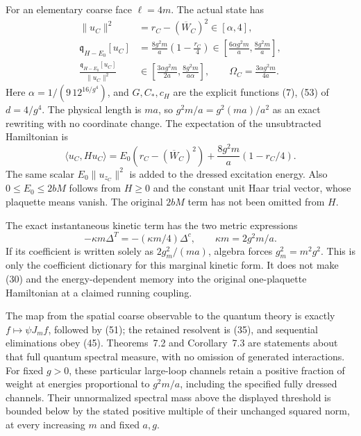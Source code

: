 \documentclass[11pt]{article}
\begin{document}
For an elementary coarse face $\ell=4m$. The actual state has
\begin{align}
 \|u_C\|^2&=r_C-(\overline W_C)^2\in[\alpha,4],\label{eq:physicalnorm}\\
 \mathfrak q_{H-E_0}[u_C]
 &=\frac{8g^2m}{a}\left(1-\frac{r_C}{4}\right)
       \in\left[\frac{6\alpha g^2m}{a},\frac{8g^2m}{a}\right],\label{eq:physicalenergy}\\
 \frac{\mathfrak q_{H-E_0}[u_C]}{\|u_C\|^2}
 &\in\left[\frac{3\alpha g^2m}{2a},\frac{8g^2m}{a\alpha}\right],
 \qquad \Omega_C=\frac{3\alpha g^2m}{4a}.\label{eq:physicalquotient}
\end{align}
Here
$\alpha=1/(9\,12^{16/g^4})$, and $G,C_*,c_H$ are the explicit functions
(7), (53) of $d=4/g^4$.
The physical length is $ma$, so $g^2m/a=g^2(ma)/a^2$ as an exact
rewriting with no coordinate change. The expectation of the unsubtracted
Hamiltonian is
\[
 \langle u_C,Hu_C\rangle
 =E_0(r_C-(\overline W_C)^2)
       +\frac{8g^2m}{a}(1-r_C/4).
\]
The same scalar $E_0\|u_{z_C}\|^2$ is added to the dressed excitation
energy. Also $0\leq E_0\leq2bM$ follows from $H\geq0$ and the constant
unit Haar trial vector, whose plaquette means vanish. The original
$2bM$ term has not been omitted from $H$.

The exact instantaneous kinetic term has the two metric expressions
\[
 -\kappa m\Delta^T=-(\kappa m/4)\Delta^c,\qquad \kappa m=2g^2m/a.
\]
If its coefficient is written solely as
$2g_m^2/(ma)$, algebra forces $g_m^2=m^2g^2$. This is only the
coefficient dictionary for this marginal kinetic form. It does not make
(30) and the energy-dependent memory into the
original one-plaquette Hamiltonian at a claimed running coupling.

The map from the spatial coarse observable to the quantum theory is
exactly $f\mapsto\psi J_mf$, followed by (51); the retained
resolvent is (35), and sequential eliminations obey
(45). Theorems~7.2 and
Corollary~7.3 are statements about that full quantum
spectral measure, with no omission of generated interactions. For fixed
$g>0$, these particular large-loop channels retain a positive fraction
of weight at energies proportional to $g^2m/a$, including the specified
fully dressed channels. Their unnormalized spectral mass above the
displayed threshold is bounded below by the stated positive multiple
of their unchanged squared norm, at every increasing $m$ and fixed $a,g$.
\end{document}
